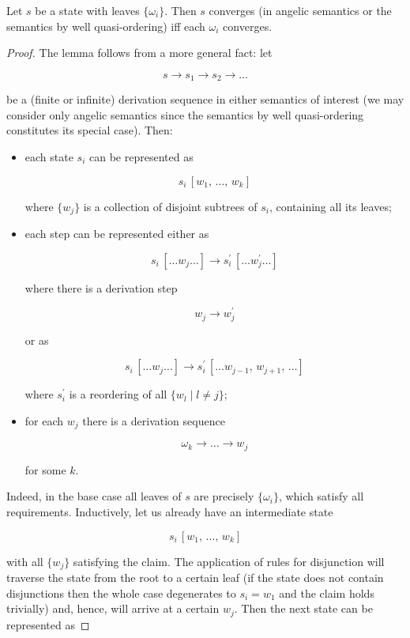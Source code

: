 \begin{lemma}
  \label{lem:convergence-of-leaves}
  Let $s$ be a state with leaves $\{\omega_i\}$. Then $s$ converges (in angelic semantics or the semantics by
  well quasi-ordering) iff each $\omega_i$ converges.
\end{lemma}
\begin{proof}
  The lemma follows from a more general fact: let

  \[
  s\to s_1\to s_2 \to \dots
  \]

  be a (finite or infinite) derivation sequence in either semantics of interest (we may consider
  only angelic semantics since the semantics by well quasi-ordering constitutes its special case).
  Then:

  \begin{itemize}
    \item each state $s_i$ can be represented as
      
      \[
      s_i\,[w_1,\,\dots,\,w_k]
      \]
      
      where $\{w_j\}$ is a collection of disjoint subtrees of $s_i$, containing all its leaves;
      
    \item each step can be represented either as
      
      \[
      s_i\,[\dots w_j\dots]\to s^\prime_i\,[\dots w^\prime_j\dots]
      \]

      where there is a derivation step

      \[
      w_j\to w^\prime_j
      \]

      or as

      \[
      s_i\,[\dots w_j\dots]\to s^\prime_i\,[\dots w_{j-1},\,w_{j+1},\,\dots]
      \]

      where $s^\prime_i$ is a reordering of all $\{w_l\mid l\ne j\}$;
     
    \item for each $w_j$ there is a derivation sequence

      \[
      \omega_k\to\dots\to w_j
      \]

      for some $k$.
  \end{itemize}

  Indeed, in the base case all leaves of $s$ are precisely $\{\omega_i\}$, which satisfy all requirements. Inductively, let
  us already have an intermediate state

  \[
  s_i\,[w_1,\,\dots,\,w_k]
  \]

  with all $\{w_j\}$ satisfying the claim. The application of rules for disjunction will traverse the state from the root to
  a certain leaf (if the state does not contain disjunctions then the whole case degenerates to $s_i=w_1$ and the claim
  holds trivially) and, hence, will arrive at a certain $w_j$. Then the next state can be represented as


\end{proof}
